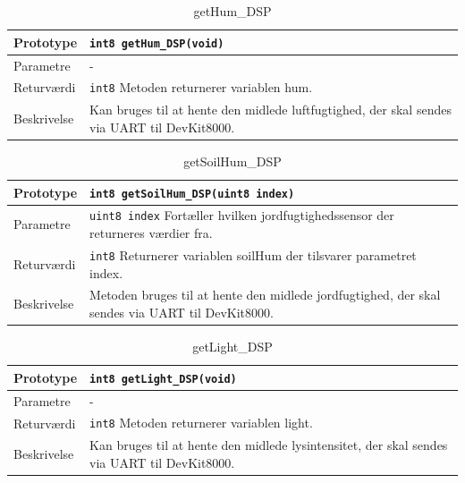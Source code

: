 
\begin{table}[h]
\begin{tabularx}{\textwidth}{| >{\raggedright\arraybackslash}p{2.5 cm} | >{\raggedright\arraybackslash}X |} \hline
Prototype & \texttt{int8 getHum\_DSP(void)} \\\hline
Parametre & - \\\hline
Returværdi & \texttt{int8} \newline
Metoden returnerer variablen hum. \\\hline
Beskrivelse & Kan bruges til at hente den midlede luftfugtighed, der skal sendes via UART til DevKit8000. \\\hline
\end{tabularx}
\caption{getHum\_DSP}
\label{table:getHum_DSP}
\end{table}


\clearpage

\begin{table}[h]
\begin{tabularx}{\textwidth}{| >{\raggedright\arraybackslash}p{2.5 cm} | >{\raggedright\arraybackslash}X |} \hline
Prototype & \texttt{int8 getSoilHum\_DSP(uint8 index)} \\\hline
Parametre & \texttt{uint8 index} \newline
Fortæller hvilken jordfugtighedssensor der returneres værdier fra. \\\hline
Returværdi & \texttt{int8} \newline
Returnerer variablen soilHum der tilsvarer parametret index. \\\hline
Beskrivelse & Metoden bruges til at hente den midlede jordfugtighed, der skal sendes via UART til DevKit8000. \\\hline
\end{tabularx}
\caption{getSoilHum\_DSP}
\label{table:getSoilHum_DSP}
\end{table}


\begin{table}[h]
\begin{tabularx}{\textwidth}{| >{\raggedright\arraybackslash}p{2.5 cm} | >{\raggedright\arraybackslash}X |} \hline
Prototype & \texttt{int8 getLight\_DSP(void)} \\\hline
Parametre & - \\\hline
Returværdi & \texttt{int8} \newline
Metoden returnerer variablen light. \\\hline
Beskrivelse & Kan bruges til at hente den midlede lysintensitet, der skal sendes via UART til DevKit8000. \\\hline
\end{tabularx}
\caption{getLight\_DSP}
\label{table:getLight_DSP}
\end{table}

